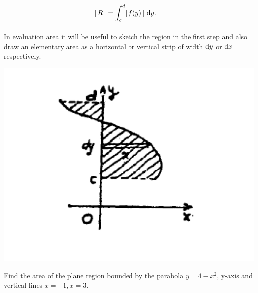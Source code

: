 \documentclass{book}
\begin{document}
		\begin{align*}
			\left \lvert \, R \, \right \rvert = \int_{c}^{d} \! \left \lvert \, f(y) \, \right \rvert \, \mathrm{d} y.	&&
		\end{align*}
	\noindent\begin{minipage}{0.55\textwidth}

\paragraph{}In evaluation area it will be useful to sketch the region in the first step and also draw an elementary area as a horizontal or vertical strip of width $\mathrm{d} y$ or $\mathrm{d} x$ respectively.

	\end{minipage}
	\begin{minipage}{0.45\textwidth}
		\includegraphics[width=\textwidth]{images/img2}
	\end{minipage}
	\begin{exmp}
		Find the area of the plane region bounded by the parabola $y = 4-x^{2}$, y-axis and vertical lines $x = -1, x=3$.
	\end{exmp}
\end{document}
